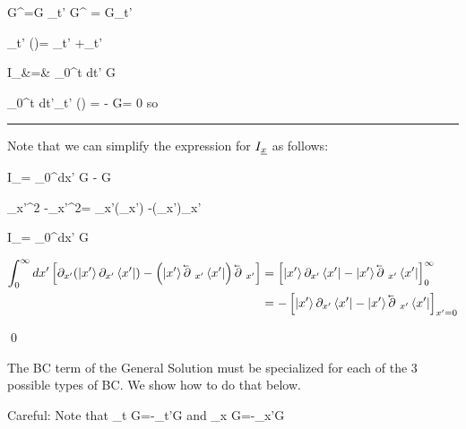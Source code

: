 \beq
 G^\dagger{}=G
\implies
\partial_{t'} G^\dagger{}
=
G\cev{\partial}_{t'}
\eeq

\beq
\partial_{t'} ()=
\partial_{t'}
+\cev{\partial}_{t'}
\eeq


\beqa
I_\rvt &=&
\int_0^t dt'
G
\ket{\eta}
\eeqa



\beq
\int_0^t
dt'\;\partial_{t'} ()
=
-
\eeq
\beq
G= 0 \quad {} 
\eeq
 so


\beq
{}
\eeq
\hrule
Note that we can simplify the
expression for $I_\rvx$ as follows:

\beq
I_\rvx =
\int_0^\infty dx'
G
\ket{\eta}
-
G
\ket{\eta}
\eeq

\beq
{}\partial_{x'}^2
-\cev{\partial}_{x'}^2=
\partial_{x'}\left(\partial_{x'}\right)
-\left(\cev{\partial}_{x'}\right)\cev{\partial}_{x'}
\eeq

\beq
I_\rvx=
\int_0^\infty dx'
G
\ket{\eta}
\eeq

\begin{align}
\int_0^\infty dx'\left[
\partial_{x'}(\ket{x'}\partial_{x'}\bra{x'})
-\left(\ket{x'}\cev{\partial}_{x'}\bra{x'}\right)\cev{\partial}_{x'}\right]
&=
\left[\ket{x'}\partial_{x'}\bra{x'}
-
\ket{x'}\cev{\partial}_{x'}\bra{x'}\right]_0^\infty
\\
&=
-\left[\ket{x'}\partial_{x'}\bra{x'}
-
\ket{x'}\cev{\partial}_{x'}\bra{x'}\right]_{x'=0}
\end{align}

\beq
{}
\eeq


\qed

The BC term 
of the General Solution 
must be specialized for
each of the 3 possible
types of BC. We show how to do  that below.

Careful: Note that
\beq
\partial_t G=-\partial_{t'}G
\eeq
and
\beq
\partial_x G=-\partial_{x'}G
\eeq

